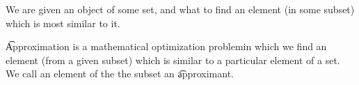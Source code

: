 

We are given an object of some set, and what to find an element (in some subset) which is most similar to it.


\t{Approximation} is a mathematical optimization problemin which we find an element (from a given subset) which is similar to a particular element of a set.
We call an element of the the subset an \t{approximant}.

